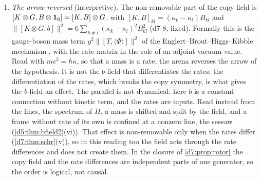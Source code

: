 \begin{remark}
\begin{enumerate}[label=(\alph*),leftmargin=2.2em]
\item \emph{The arrow reversed} (interpretive). The non-removable part of the copy field is $[K\otimes G,B\otimes\mathbf 1_6]=[K,B]\otimes G$, with
$[K,B]_{kl}=(\kappa_k-\kappa_l)B_{kl}$ and $\|[K\otimes G,b]\|^2=6\sum_{k\neq l}(\kappa_k-\kappa_l)^2B_{kl}^2$ (d7-8, fixed). Formally this is the gauge-boson
mass term $g^2\|[T,\langle\Phi\rangle]\|^2$ of the Englert--Brout--Higgs--Kibble mechanism \cite{EnglertBrout64,Higgs64,Kibble67}, with the rate matrix
in the role of an adjoint vacuum value. Read with $mc^2=\hbar\kappa$, so that a mass is a rate, the arena reverses the arrow of the hypothesis. It is not the $b$-field that differentiates the rates;
the differentiation of the rates, which breaks the copy symmetry, is what gives the $b$-field an effect. The parallel is not dynamical: here $b$ is a
constant connection without kinetic term, and the rates are inputs. Read instead from the lines, the spectrum of $H$, a mass is shifted and split by the field, and a frame without rate of its own is confined at a nonzero line, the seesaw (\cref{d5:thm:bfield2}(vi)). That effect is non-removable only when the rates differ (\cref{d7:thm:schr}(v)), so in this reading too the field acts through the rate differences and does not create them. In the closure of \cref{d7:prop:rotor} the copy field and the rate differences are independent parts of one generator, so the order is logical, not causal.
\end{enumerate}
\end{remark}

